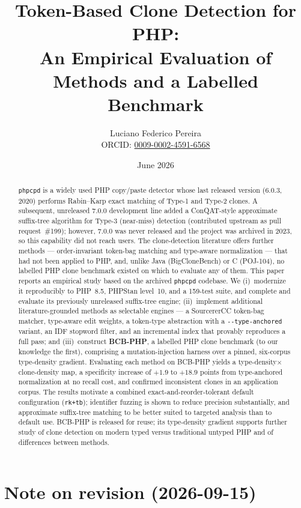 \documentclass[10pt,a4paper]{article}
\title{\textbf{Token-Based Clone Detection for PHP:\\
An Empirical Evaluation of Methods and a Labelled Benchmark}}
\author{Luciano Federico Pereira\\[2pt]
\small ORCID: \href{https://orcid.org/0009-0002-4591-6568}{0009-0002-4591-6568}}
\date{June 2026}
\newcounter{lem}[section]
\begin{document}
\maketitle

\begin{abstract}
\noindent
\texttt{phpcpd} is a widely used PHP copy/paste detector whose last released version (6.0.3, 2020)
performs Rabin--Karp exact matching of Type-1 and Type-2 clones. A subsequent, unreleased 7.0.0
development line added a ConQAT-style approximate suffix-tree algorithm for Type-3 (near-miss)
detection (contributed upstream as pull request~\#199); however, 7.0.0 was never released and the
project was archived in 2023, so this capability did not reach users. The clone-detection literature
offers further methods --- order-invariant token-bag matching and type-aware normalization --- that
had not been applied to PHP, and, unlike Java (BigCloneBench) or C (POJ-104), no labelled PHP clone
benchmark existed on which to evaluate any of them. This paper reports an empirical study based on the
archived \texttt{phpcpd} codebase. We (i)~modernize it reproducibly to PHP~8.5, PHPStan level~10, and a
159-test suite, and complete and evaluate its previously unreleased suffix-tree engine; (ii)~implement
additional literature-grounded methods as selectable engines --- a SourcererCC token-bag matcher,
type-aware edit weights, a token-type abstraction with a \texttt{-{}-type-anchored} variant, an IDF
stopword filter, and an incremental index that provably reproduces a full pass; and (iii)~construct
\textbf{BCB-PHP}, a labelled PHP clone benchmark (to our knowledge the first), comprising a
mutation-injection harness over a pinned, six-corpus type-density gradient. Evaluating each method on
BCB-PHP yields a type-density$\times$clone-density map, a specificity increase of $+1.9$ to $+18.9$
points from type-anchored normalization at no recall cost, and confirmed inconsistent clones in an
application corpus. The results motivate a combined exact-and-reorder-tolerant default configuration
(\texttt{rk+tb}); identifier fuzzing is shown to reduce precision substantially, and approximate
suffix-tree matching to be better suited to targeted analysis than to default use. BCB-PHP is released
for reuse; its type-density gradient supports further study of clone detection on modern typed versus
traditional untyped PHP and of differences between methods.
\end{abstract}

\section*{Note on revision (2026-09-15)}
\end{document}
